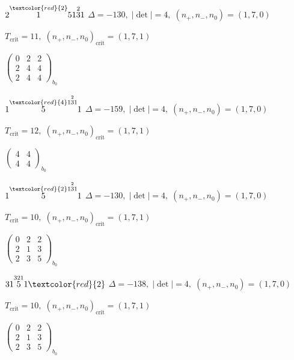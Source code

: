 \documentclass[10pt]{article}
\begin{document}
$2\overset{\textcolor{red}{2}}{1}51\overset{2}{3}1$ \quad $\Delta=-130,\; |\det|=4,\; (n_+,n_-,n_0)=(1,7,0)$

\hspace{1em}$T_{\text{crit}}=11,\; (n_+,n_-,n_0)_{\text{crit}}=(1,7,1)$

\hspace{2em}$\left(\begin{smallmatrix}0 & 2 & 2 \\ 2 & 4 & 4 \\ 2 & 4 & 4\end{smallmatrix}\right)_{\!b_0}$

\smallskip

$1\overset{\textcolor{red}{4}1\overset{2}{3}1}{5}1$ \quad $\Delta=-159,\; |\det|=4,\; (n_+,n_-,n_0)=(1,7,0)$

\hspace{1em}$T_{\text{crit}}=12,\; (n_+,n_-,n_0)_{\text{crit}}=(1,7,1)$

\hspace{2em}$\left(\begin{smallmatrix}4 & 4 \\ 4 & 4\end{smallmatrix}\right)_{\!b_0}$

$1\overset{\textcolor{red}{2}1\overset{2}{3}1}{5}1$ \quad $\Delta=-130,\; |\det|=4,\; (n_+,n_-,n_0)=(1,7,0)$

\hspace{1em}$T_{\text{crit}}=10,\; (n_+,n_-,n_0)_{\text{crit}}=(1,7,1)$

\hspace{2em}$\left(\begin{smallmatrix}0 & 2 & 2 \\ 2 & 1 & 3 \\ 2 & 3 & 5\end{smallmatrix}\right)_{\!b_0}$

\smallskip

$31\overset{321}{5}1\textcolor{red}{2}$ \quad $\Delta=-138,\; |\det|=4,\; (n_+,n_-,n_0)=(1,7,0)$

\hspace{1em}$T_{\text{crit}}=10,\; (n_+,n_-,n_0)_{\text{crit}}=(1,7,1)$

\hspace{2em}$\left(\begin{smallmatrix}0 & 2 & 2 \\ 2 & 1 & 3 \\ 2 & 3 & 5\end{smallmatrix}\right)_{\!b_0}$
\end{document}
